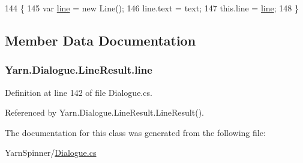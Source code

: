 \begin{DoxyCode}
144                                             \{
145                 var \hyperlink{a00124_abfbb0ea840b02acd0ecdc72c5b120257}{line} = \textcolor{keyword}{new} Line();
146                 line.text = text;
147                 this.line = \hyperlink{a00124_abfbb0ea840b02acd0ecdc72c5b120257}{line};
148             \}
\end{DoxyCode}


\subsection{Member Data Documentation}
\hypertarget{a00124_abfbb0ea840b02acd0ecdc72c5b120257}{
\subsubsection[{line}]{ Yarn.\-Dialogue.\-Line\-Result.\-line}}\label{a00124_abfbb0ea840b02acd0ecdc72c5b120257}


Definition at line 142 of file Dialogue.\-cs.



Referenced by Yarn.\-Dialogue.\-Line\-Result.\-Line\-Result().



The documentation for this class was generated from the following file\-:\begin{DoxyCompactItemize}
\item 
Yarn\-Spinner/\hyperlink{a00282}{Dialogue.\-cs}\end{DoxyCompactItemize}
